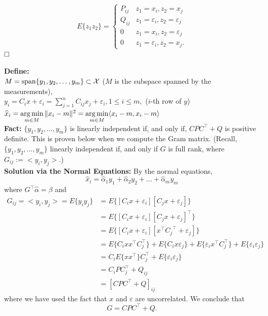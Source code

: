   \begin{rem}
  $$ E\{z_1z_2\} = \begin{cases} P_{ij} & z_1 = x_i, z_2 = x_j \\  Q_{ij} & z_1 = \varepsilon_i, z_2=\varepsilon_j \\ 0 &  z_1 = x_i, z_2=\varepsilon_j \\ 0 &  z_1 = \varepsilon_i, z_2=x_j. \end{cases}$$
  $\hfill \square$  \end{rem}

\textbf{Define:} \\
$M = \mathrm{span} \{ y_1,y_2,\dots,y_m \} \subset \mathcal{X}$ ($M$ is the subspace spanned by the measurements),\\

$y_i = C_ix+\varepsilon_i = \sum\limits_{j=1}^n C_{ij}x_j+\varepsilon_i, 1\le i \le m,$  ($i$-th row of $y$)\\

$\widehat{x}_i = \operatorname*{arg\,min}\limits_{m \in M} \|x_i-m\|^2 =  \operatorname*{arg\,min} \limits_{m \in M}  \langle x_i-m, x_i-m \rangle $\\


\textbf{Fact:} $\{y_1,y_2,\dots,y_m\}$ is linearly independent if, and only if, $CPC^\top +Q$ is positive definite. This is proven below when we compute the Gram matrix. (Recall, $\{y_1,y_2,\dots,y_m\}$ linearly independent if, and only if $G$ is full rank, where $G_{ij}:=<y_i,y_j>.$)\\


\textbf{ Solution via the Normal Equations:} By the normal equations,
$$\widehat{x}_i = \widehat \alpha_1 y_1  +  \widehat \alpha_2 y_2  + \dots + \widehat \alpha_m y_m$$
where $G^\top \widehat \alpha = \beta$ and
\begin{align*}
G_{ij} = <y_i,y_j> = E\{y_i y_j\} &= E\{[C_i x+\varepsilon_i][C_j x+\varepsilon_j]\}\\
& = E\{[C_i x+\varepsilon_i][C_j x+\varepsilon_j]^\top \}\\
& = E\{[C_i x+\varepsilon_i][x^\top  {C_j}^\top  +\varepsilon_j]\}\\
& = E\{C_i xx^\top  C_j^\top \} + E\{C_i x\varepsilon_j\} + E\{\varepsilon_i x^\top  C_j^\top \} + E\{ \varepsilon_i \varepsilon_j\}\\
& = C_iE\{ xx^\top  \}C_j^\top  + E\{ \varepsilon_i \varepsilon_j\}\\
& = C_i P C_j^\top  + Q_{ij}\\
&=[CPC^\top +Q]_{ij}\
\end{align*}
where we have used the fact that $x$ and $\varepsilon$ are uncorrelated. We conclude that
$$G = CPC^\top +Q.$$

